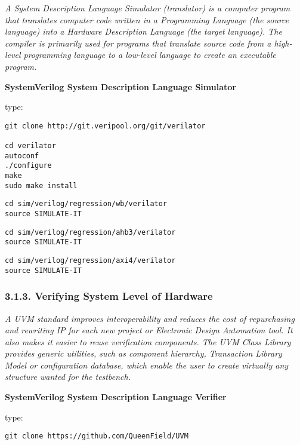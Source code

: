 \documentclass[]{article}
\begin{document}
\emph{A System Description Language Simulator (translator) is a computer
program that translates computer code written in a Programming Language
(the source language) into a Hardware Description Language (the target
language). The compiler is primarily used for programs that translate
source code from a high-level programming language to a low-level
language to create an executable program.}

\textbf{SystemVerilog System Description Language Simulator}

type:

\begin{verbatim}
git clone http://git.veripool.org/git/verilator

cd verilator
autoconf
./configure
make
sudo make install
\end{verbatim}

\begin{verbatim}
cd sim/verilog/regression/wb/verilator
source SIMULATE-IT
\end{verbatim}

\begin{verbatim}
cd sim/verilog/regression/ahb3/verilator
source SIMULATE-IT
\end{verbatim}

\begin{verbatim}
cd sim/verilog/regression/axi4/verilator
source SIMULATE-IT
\end{verbatim}

\subsubsection{3.1.3. Verifying System Level of
Hardware}\label{verifying-system-level-of-hardware}

\emph{A UVM standard improves interoperability and reduces the cost of
repurchasing and rewriting IP for each new project or Electronic Design
Automation tool. It also makes it easier to reuse verification
components. The UVM Class Library provides generic utilities, such as
component hierarchy, Transaction Library Model or configuration
database, which enable the user to create virtually any structure wanted
for the testbench.}

\textbf{SystemVerilog System Description Language Verifier}

type:

\begin{verbatim}
git clone https://github.com/QueenField/UVM
\end{verbatim}
\end{document}
